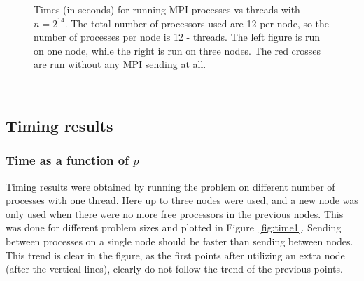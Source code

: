 \begin{figure}[h!]
\begin{subfigure}[b]{0.48\textwidth}
  \end{subfigure}
  \vspace{-0.1\baselineskip}
  \caption{Times (in seconds) for running MPI processes vs threads with $n = 2^{14}$. The total number of processors used are 12 per node, so the number of processes per node is 12 - threads. The left figure is run on one node, while the right is run on three nodes. The red crosses are run without any MPI sending at all.}
  \label{fig:taskc}
\end{figure}
\\
\subsection{Timing results}
\subsubsection{Time as a function of $p$}
Timing results were obtained by running the problem on different number of processes with one thread. Here up to three nodes were used, and a new node was only used when there were no more free processors in the previous nodes. This was done for different problem sizes and plotted in Figure~\ref{fig:time1}. Sending between processes on a single node should be faster than sending between nodes. This trend is clear in the figure, as the first points after utilizing an extra node (after the vertical lines), clearly do not follow the trend of the previous points. 

